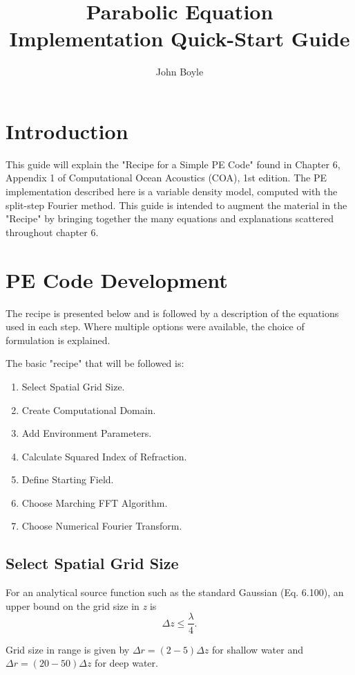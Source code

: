\documentclass[12pt]{article}
\author{John Boyle}
\title{Parabolic Equation Implementation Quick-Start Guide}
\begin{document}
\maketitle
\tableofcontents

\section{Introduction}
  This guide will explain the "Recipe for a Simple PE Code" found in
  Chapter 6, Appendix 1 of Computational Ocean Acoustics (COA), 1st
  edition. The PE implementation described here is a variable density
  model, computed with the split-step Fourier method. This guide is
  intended to augment the material in the "Recipe" by bringing together
  the many equations and explanations scattered throughout chapter 6.

\section{PE Code Development}
The recipe is presented below and is followed by a description of
the equations used in each step. Where multiple options were
available, the choice of formulation is explained.

The basic "recipe" that will be followed is:
\flushleft
\begin{enumerate}
\item Select Spatial Grid Size.
\item Create Computational Domain.
\item Add Environment Parameters.
\item Calculate Squared Index of Refraction.
\item Define Starting Field.
\item Choose Marching FFT Algorithm.
\item Choose Numerical Fourier Transform.
\end{enumerate}

\subsection{Select Spatial Grid Size}
For an analytical source function such as the standard Gaussian (Eq.
6.100), an upper bound on the grid size in \textit{z} is 
\begin{equation*}
\Delta z \leq \frac{\lambda}{4}.
\end{equation*}

Grid size in range is given by $ \Delta r = (2 - 5)\Delta z$ for shallow water and 
$ \Delta r = (20 - 50)\Delta z$ for deep water.
\end{document}
